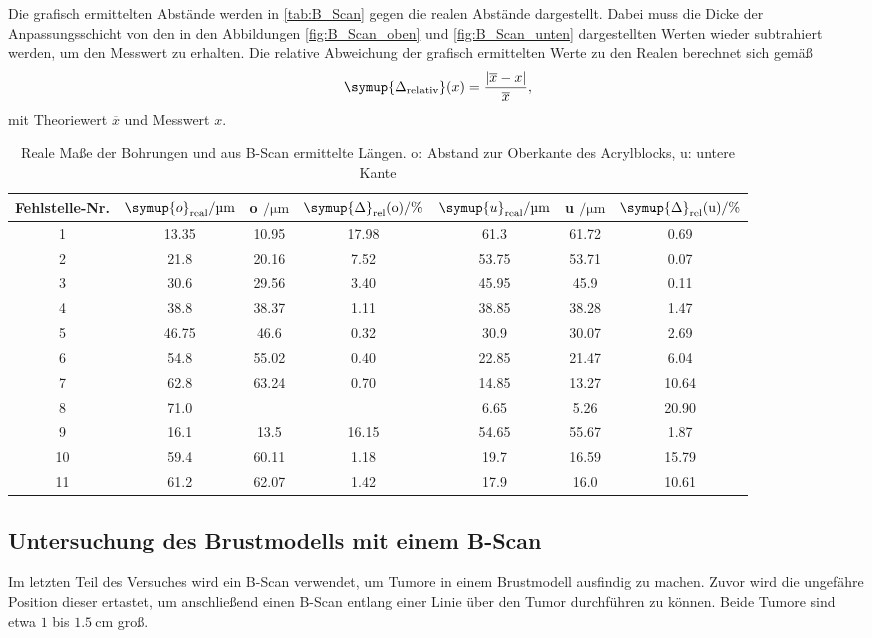 Die grafisch ermittelten Abstände werden in \autoref{tab:B_Scan} gegen die realen Abstände dargestellt. Dabei muss die Dicke der Anpassungsschicht von den in den Abbildungen
\ref{fig:B_Scan_oben} und \ref{fig:B_Scan_unten} dargestellten Werten wieder subtrahiert werden, um den Messwert zu erhalten.
Die relative Abweichung der grafisch ermittelten Werte zu den Realen berechnet sich gemäß
\begin{equation*}
  \symup{\Delta_\text{relativ}}(x) = \frac{|\overline{x} - x|}{\overline{x}},
\end{equation*}
mit Theoriewert $\overline{x}$ und Messwert $x$.

\begin{table}[H]
  \centering
  \caption{Reale Maße der Bohrungen und aus B-Scan ermittelte Längen. 
  o: Abstand zur Oberkante des Acrylblocks, u: untere Kante}
  \label{tab:B_Scan}
  \begin{tabular}{c S[table-format = 2.2] S S S S S}
    \toprule
    {Fehlstelle-Nr.} & {$\symup{o}_\text{real} / \unit{\micro\meter}$}  & {o $ / \unit{\micro\meter}$} & {$\symup{\Delta}_\text{rel}(\text{o}) / \%$} &%
    {$\symup{u}_\text{real} / \unit{\micro\meter}$} & {u $/ \unit{\micro\meter}$} & {$\symup{\Delta}_\text{rel}(\text{u}) / \%$} \\
     & 13.35 & 10.95 & 17.98 & 61.3  & 61.72 &  0.69 \\
     2 & 21.8  & 20.16 &  7.52 & 53.75 & 53.71 &  0.07 \\
     3 & 30.6  & 29.56 &  3.40 & 45.95 & 45.9  &  0.11 \\
     4 & 38.8  & 38.37 &  1.11 & 38.85 & 38.28 &  1.47 \\
     5 & 46.75 & 46.6  &  0.32 & 30.9  & 30.07 &  2.69 \\
     6 & 54.8  & 55.02 &  0.40 & 22.85 & 21.47 &  6.04 \\
     7 & 62.8  & 63.24 &  0.70 & 14.85 & 13.27 & 10.64 \\
     8 & 71.0  &       &       &  6.65 &  5.26 & 20.90 \\
     9 & 16.1  & 13.5  & 16.15 & 54.65 & 55.67 &  1.87 \\
    10 & 59.4  & 60.11 &  1.18 & 19.7  & 16.59 & 15.79 \\
    11 & 61.2  & 62.07 &  1.42 & 17.9  & 16.0  & 10.61 \\
    \bottomrule
  \end{tabular}
\end{table}

\subsection{Untersuchung des Brustmodells mit einem B-Scan}
\label{subsec:Brustmodell}
Im letzten Teil des Versuches wird ein B-Scan verwendet, um Tumore in einem Brustmodell ausfindig zu machen. Zuvor wird die ungefähre Position dieser
ertastet, um anschließend einen B-Scan entlang einer Linie über den Tumor durchführen zu können. Beide Tumore sind etwa $1$ bis $\qty{1.5}{\centi\metre}$ groß.

